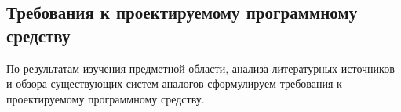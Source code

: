 \subsection{Требования к проектируемому программному средству}
\label{sec:analysis:research:req}

По результатам изучения предметной области, анализа литературных источников и обзора существующих систем-аналогов сформулируем требования к проектируемому программному средству.








